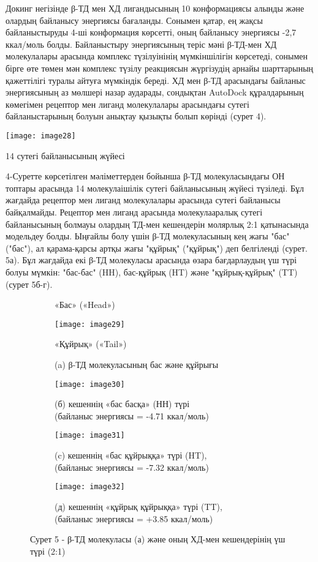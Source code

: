 \begin{multicols}{2}
Докинг негізінде β-ТД мен ХД лигандысының 10 конформациясы алынды және
олардың байланысу энергиясы бағаланды. Сонымен қатар, ең жақсы
байланыстыруды 4-ші конформация көрсетті, оның байланысу энергиясы -2,7
ккал/моль болды. Байланыстыру энергиясының теріс мәні β-ТД-мен ХД
молекулалары арасында комплекс түзілуінінің мүмкіншілігін көрсетеді,
сонымен бірге өте төмен мән комплекс түзілу реакциясын жүргізудің арнайы
шарттарының қажеттілігі туралы айтуға мүмкіндік береді. ХД мен β-ТД
арасындағы байланыс энергиясының аз мөлшері назар аударады, сондықтан
AutoDock құралдарының көмегімен рецептор мен лиганд молекулалары
арасындағы сутегі байланыстарының болуын анықтау қызықты болып көрінді
(сурет 4).

{\centering
\texttt{[image: image28]}
}

14 сутегі байланысының жүйесі

4-Суретте көрсетілген мәліметтерден бойынша β-ТД молекуласындағы ОН
топтары арасында 14 молекулаішілік сутегі байланысының жүйесі түзіледі.
Бұл жағдайда рецептор мен лиганд молекулалары арасында сутегі байланысы
байқалмайды. Рецептор мен лиганд арасында молекулааралық сутегі
байланысының болмауы олардың ТД-мен кешендерін молярлық 2:1 қатынасында
модельдеу болды. Ыңғайлы болу үшін β-ТД молекуласының кең жағы "бас"
("бас"), ал қарама-қарсы артқы жағы "құйрық" ("құйрық") деп белгіленді
(сурет. 5а). Бұл жағдайда екі β-ТД молекуласы арасында өзара
бағдарлаудың үш түрі болуы мүмкін: "бас-бас" (HH), бас-құйрық (HT) және
"құйрық-құйрық" (TT) (сурет 5б-г).
\end{multicols}

\begin{figure}[H]
\centering
\begin{subfigure}[b]{0.4\textwidth}
\centering
\caption*{«Бас» («Head»)}
\texttt{[image: image29]}
\caption*{«Құйрық» («Tail»)}
\caption*{(a) β-ТД молекуласының бас және құйрығы}
\end{subfigure}
\begin{subfigure}[b]{0.4\textwidth}
\centering
\texttt{[image: image30]}
\caption*{(б) кешеннің «бас басқа» (НН) түрі \\
(байланыс энергиясы = -4.71 ккал/моль)}
\end{subfigure}
\begin{subfigure}[b]{0.4\textwidth}
\centering
\texttt{[image: image31]}
\caption*{(c) кешеннің «бас құйрыққа» түрі (HT), \\
(байланыс энергиясы = -7.32 ккал/моль)}
\end{subfigure}
\begin{subfigure}[b]{0.4\textwidth}
\centering
\texttt{[image: image32]}
\caption*{(д) кешеннің «құйрық құйрыққа» түрі (TT), \\
(байланыс энергиясы = +3.85 ккал/моль)}
\end{subfigure}
\caption*{Сурет 5 - β-ТД молекуласы (а) және оның ХД-мен кешендерінің үш түрі (2:1)}
\end{figure}

